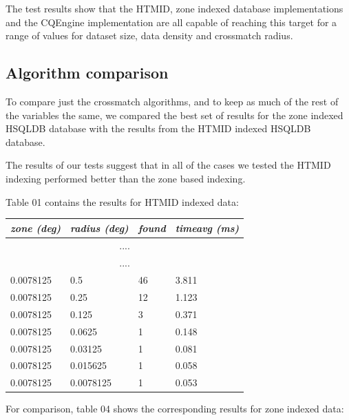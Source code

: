 \documentclass{article}
\newcommand{\hsqldb} {HSQLDB\xspace}
\newcommand{\cqengine} {CQEngine\xspace}
\newcommand{\htmid} {HTMID\xspace}
\newcommand{\crossmatch} {crossmatch\xspace}
\newcommand{\dataset} {dataset\xspace}
\begin{document}
The test results show that the \htmid, zone indexed database implementations and the \cqengine implementation are all capable of reaching this target for a range of values for \dataset size, data density and \crossmatch radius.

\subsection{Algorithm comparison}
\label{algorithm-comparison}

To compare just the \crossmatch algorithms, and to keep as much of the rest of the variables the same, we compared the best set of results for the zone indexed \hsqldb database with the results from the \htmid indexed \hsqldb database.

The results of our tests suggest that in all of the cases we tested the \htmid indexing performed better than the zone based indexing.

Table 01 contains the results for \htmid indexed data:

\begin{table}[hbt!]
\centering
\begin{tabular}{|l|l|l|l|}
\hline
\textit{zone (deg)} & \textit{radius (deg)} & \textit{found} & \textit{timeavg (ms)} \\ \hline
\multicolumn{4}{|c|}{....} \\ \hline
\multicolumn{4}{|c|}{....} \\ \hline
0.0078125 & 0.5       & 46 & 3.811 \\ \hline
0.0078125 & 0.25      & 12 & 1.123 \\ \hline
0.0078125 & 0.125     &  3 & 0.371 \\ \hline
0.0078125 & 0.0625    &  1 & 0.148 \\ \hline
0.0078125 & 0.03125   &  1 & 0.081 \\ \hline
0.0078125 & 0.015625  &  1 & 0.058 \\ \hline
0.0078125 & 0.0078125 &  1 & 0.053 \\ \hline
\end{tabular}
\end{table}

For comparison, table 04 shows the corresponding results for zone indexed data:
\end{document}

